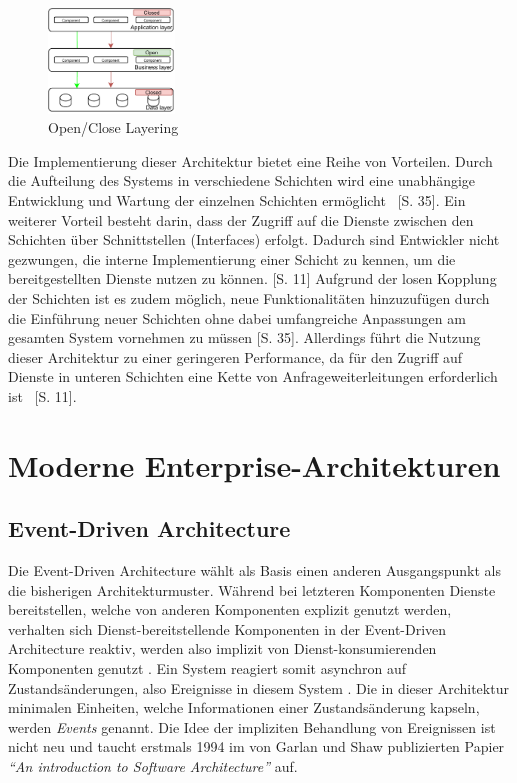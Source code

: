 \documentclass[acmtog]{acmart}
\begin{document}
\begin{figure}[h!]
    \centering
    \includegraphics[width=0.3\textwidth]{images/layer2.pdf}
    \caption{Open/Close Layering}
    \label{fig:layered-request-flow}
\end{figure}

Die Implementierung dieser Architektur bietet eine Reihe von Vorteilen.
Durch die Aufteilung des Systems in verschiedene Schichten wird eine unabhängige
Entwicklung und Wartung der einzelnen Schichten ermöglicht ~\cite{layered2}[S. 35].
Ein weiterer Vorteil besteht darin, dass der Zugriff auf die Dienste zwischen den
Schichten über Schnittstellen (Interfaces) erfolgt.
Dadurch sind Entwickler nicht gezwungen, die interne Implementierung einer Schicht zu kennen, um die bereitgestellten
Dienste nutzen zu können. \cite{layered4}[S. 11]
Aufgrund der losen Kopplung der Schichten ist es zudem möglich, neue Funktionalitäten
hinzuzufügen durch die Einführung neuer Schichten ohne dabei umfangreiche Anpassungen am gesamten
System vornehmen zu müssen \cite{layered2}[S. 35].
Allerdings führt die Nutzung dieser Architektur zu einer geringeren Performance, da für
den Zugriff auf Dienste in unteren Schichten eine Kette von Anfrageweiterleitungen erforderlich ist ~\cite{layered4}[S. 11].
\section{Moderne Enterprise-Architekturen}

\subsection{Event-Driven Architecture}
Die Event-Driven Architecture wählt als Basis einen anderen Ausgangspunkt als die bisherigen Architekturmuster.
Während bei letzteren Komponenten Dienste bereitstellen, welche von anderen Komponenten explizit genutzt werden,
verhalten sich Dienst-bereitstellende Komponenten in der Event-Driven Architecture reaktiv,
werden also implizit von Dienst-konsumierenden Komponenten genutzt \cite{garlanShawImplizit}.
Ein System reagiert somit asynchron auf Zustandsänderungen, also Ereignisse in diesem System \cite{eda}.
Die in dieser Architektur minimalen Einheiten, welche Informationen einer Zustandsänderung kapseln, werden \textit{Events} genannt.
Die Idee der impliziten Behandlung von Ereignissen ist nicht neu und taucht erstmals 1994 im von Garlan und Shaw publizierten Papier
\textit{\enquote{An introduction to Software Architecture}} auf.
\end{document}
